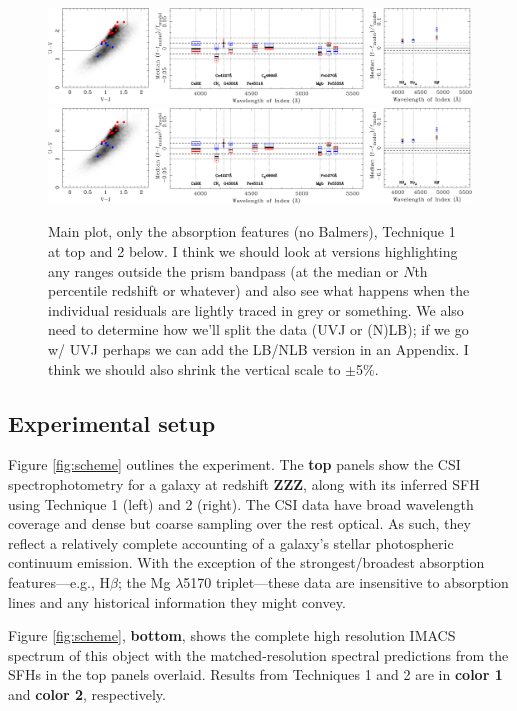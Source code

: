 \documentclass[a4paper,fleqn,usenatbib]{mnras}
\newcommand{\resp}{respectively}
\newcommand{\bfr}{\bf\color{red}}
\newcommand{\bfb}{\color{myblue}}
\begin{document}
\begin{figure}
\includegraphics[width = \textwidth]{residuals}
\includegraphics[width = \textwidth]{residuals}
\caption{\bfb Main plot, only the absorption features (no Balmers), Technique 1 at top and 2 below.
		I think we should look at versions highlighting any ranges outside the prism bandpass 
		(at the median or $N$th percentile redshift or whatever) and also see what happens when
		the individual residuals are lightly traced in grey or something. We also need to determine
		how we'll split the data (UVJ or (N)LB); if we go w/ UVJ perhaps we can add the LB/NLB
		version in an Appendix. I think we should also shrink the vertical scale to $\pm$5\%.}
\label{fig:resids}
\end{figure}

\subsection{Experimental setup}
\label{sec:setup}

Figure \ref{fig:scheme} outlines the experiment. The {\bfr top} panels show the
CSI spectrophotometry for a galaxy at redshift {\bfr ZZZ}, along with its inferred SFH using Technique 
1 (left) and 2 (right). The CSI data have broad wavelength 
coverage and dense but coarse sampling over the rest optical. As such, they reflect a relatively
complete accounting of a galaxy's stellar photospheric continuum emission. With the exception of the
strongest/broadest absorption features---e.g., H$\beta$; the Mg $\lambda$5170 triplet---these data are 
insensitive to absorption lines and any historical information they might convey.

Figure \ref{fig:scheme}, {\bfr bottom}, shows the complete high resolution IMACS spectrum of 
this object with the matched-resolution spectral predictions from the SFHs in the top panels overlaid. 
Results from Techniques 1 and 2 are in {\bfr color 1} and {\bfr color 2}, \resp. 
\end{document}
